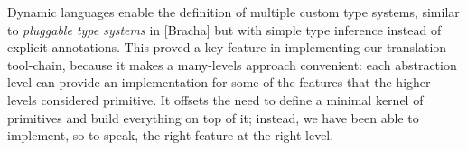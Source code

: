 \documentclass{acm_proc_article-sp}
\begin{document}
Dynamic languages enable the definition of multiple custom type systems,
similar to \textit{pluggable type systems} in [Bracha] but with simple
type inference instead of explicit annotations.  This proved a key
feature in implementing our translation tool-chain, because it makes a
many-levels approach convenient: each abstraction level can provide an
implementation for some of the features that the higher levels
considered primitive.  It offsets the need to define a minimal kernel of
primitives and build everything on top of it; instead, we have been able
to implement, so to speak, the right feature at the right level.
\end{document}
